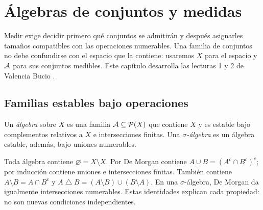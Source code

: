 \chapter{Álgebras de conjuntos y medidas}\label{cap:v2-01}
Medir exige decidir primero qué conjuntos se admitirán y después asignarles tamaños compatibles con las operaciones numerables. Una familia de conjuntos no debe confundirse con el espacio que la contiene: usaremos $X$ para el espacio y $\mathcal A$ para sus conjuntos medibles. Este capítulo desarrolla las lecturas 1 y 2 de Valencia Bucio \cite{valencia2}.

\section{Familias estables bajo operaciones}\label{lectura:v2-01}
\begin{definicion}
Un \emph{álgebra} sobre $X$ es una familia $\mathcal A\subseteq\mathcal P(X)$ que contiene $X$ y es estable bajo complementos relativos a $X$ e intersecciones finitas. Una \emph{$\sigma$-álgebra} es un álgebra estable, además, bajo uniones numerables.
\end{definicion}
Toda álgebra contiene $\varnothing=X\setminus X$. Por De Morgan contiene $A\cup B=(A^c\cap B^c)^c$; por inducción contiene uniones e intersecciones finitas. También contiene $A\setminus B=A\cap B^c$ y $A\mathbin\triangle B=(A\setminus B)\cup(B\setminus A)$. En una $\sigma$-álgebra, De Morgan da igualmente intersecciones numerables. Estas identidades explican cada propiedad: no son nuevas condiciones independientes.

